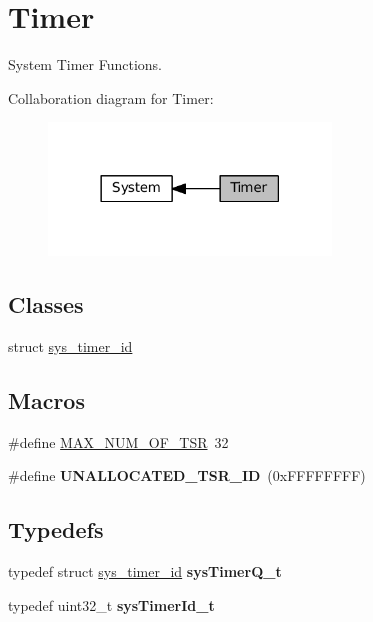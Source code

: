\hypertarget{group__SYSTEM__TIMER}{}\section{Timer}
\label{group__SYSTEM__TIMER}


System Timer Functions.  


Collaboration diagram for Timer\+:\nopagebreak
\begin{figure}[H]
\begin{center}
\leavevmode
\includegraphics[width=213pt]{group__SYSTEM__TIMER}
\end{center}
\end{figure}
\subsection*{Classes}
\begin{DoxyCompactItemize}
\item 
struct \hyperlink{structsys__timer__id}{sys\+\_\+timer\+\_\+id}
\end{DoxyCompactItemize}
\subsection*{Macros}
\begin{DoxyCompactItemize}
\item 
\#define \hyperlink{group__SYSTEM__TIMER_gad99ad563a1a632fde508ad8be6422e57}{M\+A\+X\+\_\+\+N\+U\+M\+\_\+\+O\+F\+\_\+\+T\+SR}~32
\item 
\mbox{\label{group__SYSTEM__TIMER_ga3ab2d3270619515d0cfdc5caf09d6366}} 
\#define {\bfseries U\+N\+A\+L\+L\+O\+C\+A\+T\+E\+D\+\_\+\+T\+S\+R\+\_\+\+ID}~(0x\+F\+F\+F\+F\+F\+F\+F\+F)
\end{DoxyCompactItemize}
\subsection*{Typedefs}
\begin{DoxyCompactItemize}
\item 
\mbox{\label{group__SYSTEM__TIMER_ga0964d5651c1e8775bdedb28ad089d8b9}} 
typedef struct \hyperlink{structsys__timer__id}{sys\+\_\+timer\+\_\+id} {\bfseries sys\+Timer\+Q\+\_\+t}
\item 
\mbox{\label{group__SYSTEM__TIMER_ga45dfe75dba9f4d77371435e6ea122117}} 
typedef uint32\+\_\+t {\bfseries sys\+Timer\+Id\+\_\+t}
\end{DoxyCompactItemize}
